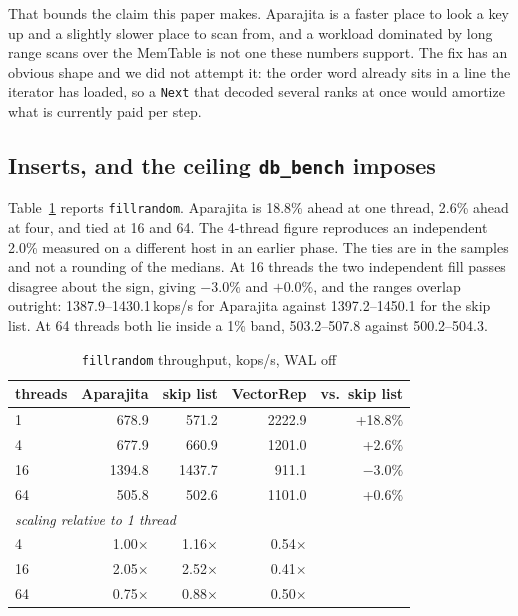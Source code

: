 \documentclass[conference]{IEEEtran}
\begin{document}
That bounds the claim this paper makes. Aparajita is a faster place to look a key
up and a slightly slower place to scan from, and a workload dominated by long range
scans over the MemTable is not one these numbers support. The fix has an obvious
shape and we did not attempt it: the order word already sits in a line the iterator
has loaded, so a \texttt{Next} that decoded several ranks at once would amortize
what is currently paid per step.

\subsection{Inserts, and the ceiling \texttt{db\_bench} imposes}
\label{sec:writes}

Table~\ref{tab:writes} reports \texttt{fillrandom}. Aparajita is 18.8\% ahead at
one thread, 2.6\% ahead at four, and tied at 16 and 64. The 4-thread figure
reproduces an independent 2.0\% measured on a different host in an earlier phase.
The ties are in the samples and not a rounding of the medians. At 16 threads the
two independent fill passes disagree about the sign, giving $-3.0\%$ and $+0.0\%$,
and the ranges overlap outright: 1387.9--1430.1\,kops/s for Aparajita against
1397.2--1450.1 for the skip list. At 64 threads both lie inside a 1\% band,
503.2--507.8 against 500.2--504.3.

\begin{table}[t]
\caption{\texttt{fillrandom} throughput, kops/s, WAL off}
\label{tab:writes}
\centering
\begin{tabular}{lrrrr}
\toprule
threads & Aparajita & skip list & VectorRep & vs.\ skip list \\
\midrule
1  &  678.9 &  571.2 & 2222.9 & +18.8\% \\
4  &  677.9 &  660.9 & 1201.0 &  +2.6\% \\
16 & 1394.8 & 1437.7 &  911.1 &  $-$3.0\% \\
64 &  505.8 &  502.6 & 1101.0 &  +0.6\% \\
\midrule
\multicolumn{5}{l}{\emph{scaling relative to 1 thread}} \\
4  & 1.00$\times$ & 1.16$\times$ & 0.54$\times$ & \\
16 & 2.05$\times$ & 2.52$\times$ & 0.41$\times$ & \\
64 & 0.75$\times$ & 0.88$\times$ & 0.50$\times$ & \\
\bottomrule
\end{tabular}
\end{table}
\end{document}
